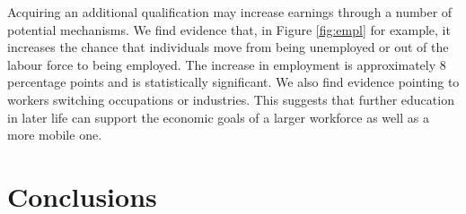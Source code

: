 \documentclass[12pt, a4paper]{article}
\begin{document}
%
%

Acquiring an additional qualification may increase earnings through a number of
potential mechanisms. We find evidence that, in Figure \ref{fig:empl} for
example, it increases the chance that individuals move from being unemployed or
out of the labour force to being employed. The increase in employment is
approximately 8 percentage points and is statistically significant. We also
find evidence pointing to workers switching occupations or industries. This
suggests that further education in later life can support the economic goals of
a larger workforce as well as a more mobile one.

\section{Conclusions}
\end{document}
